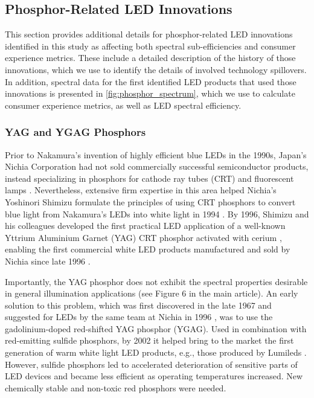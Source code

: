 \documentclass[parskip=full]{article}
\begin{document}
\subsection{Phosphor-Related LED Innovations}
\label{sec:innovation_phosphor}

This section provides additional details for phosphor-related LED innovations identified in this study as affecting both spectral sub-efficiencies and consumer experience metrics. These include a detailed description of the history of those innovations, which we use to identify the details of involved technology spillovers. In addition, spectral data for the first identified LED products that used those innovations is presented in \cref{fig:phosphor_spectrum}, which we use to calculate consumer experience metrics, as well as LED spectral efficiency.

\subsubsection{YAG and YGAG Phosphors}

Prior to Nakamura’s invention of highly efficient blue LEDs in the 1990s, Japan’s Nichia Corporation had not sold commercially successful semiconductor products, instead specializing in phosphors for cathode ray tubes (CRT) and fluorescent lamps \cite{nakamura2013blue}  . Nevertheless, extensive firm expertise in this area helped Nichia’s Yoshinori Shimizu formulate the principles of using CRT phosphors to convert blue light from Nakamura’s LEDs into white light in 1994 \cite{shimizu1994sheet}\cite{cho2017white}. By 1996, Shimizu and his colleagues developed \cite{bando1996}\cite{shimizu1999light} the first practical LED application of a well-known Yttrium Aluminium Garnet (YAG) CRT phosphor activated with cerium \cite{blasse1967new}, enabling the first commercial white LED products manufactured and sold by Nichia since late 1996 \cite{bando1998development}\cite{cho2017white}. 

Importantly, the YAG phosphor does not exhibit the spectral properties desirable in general illumination applications (see Figure 6 in the main article). An early solution to this problem, which was first discovered in the late 1967 \cite{holloway1969optical} and suggested for LEDs by the same team at Nichia in 1996 \cite{bando1998development}\cite{shimizu1999light}, was to use the gadolinium-doped red-shifted YAG phosphor (YGAG). Used in combination with red-emitting sulfide phosphors, by 2002 it helped bring to the market the first generation of warm white light LED products, e.g., those produced by Lumileds \cite{Mueller2002}. However, sulfide phosphors led to accelerated deterioration of sensitive parts of LED devices and became less efficient as operating temperatures increased. New chemically stable and non-toxic red phosphors were needed. 
\end{document}
